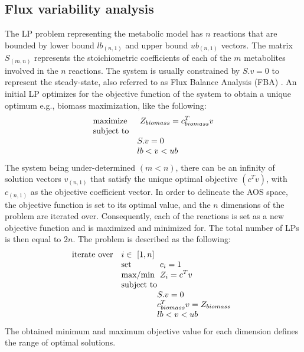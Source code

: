 \subsection*{Flux variability analysis}
The LP problem representing the metabolic model has $n$ reactions that are bounded by lower bound $lb_{(n,1)}$ and upper bound $ub_{(n,1)}$ vectors.  The matrix $S_{(m,n)}$ represents the stoichiometric coefficients of each of the $m$ metabolites involved in the $n$ reactions. The system is usually constrained by $S.v=0$ to represent the steady-state, also referred to as Flux Balance Analysis (FBA) \cite{orth2010flux}. An initial LP optimizes for the objective function of the system to obtain a unique optimum e.g., biomass maximization, like the following:
\begin{equation} \label{eq:one}
\begin{array}{ll@{}ll}
\text{maximize}  & \displaystyle\ Z_{biomass}=c^{T}_{biomass}v &\\
\text{subject to}\\
& S.v=0 \\
& lb<v<ub
\end{array}
\end{equation}
The system being under-determined $(m<n)$, there can be an infinity of solution vectors $v_{(n,1)}$ that satisfy the unique optimal objective $(c^{T}v)$, with $c_{(n,1)}$ as the objective coefficient vector. In order to delineate the AOS space, the objective function is set to its optimal value, and the $n$ dimensions of the problem are iterated over. Consequently, each of the reactions is set as a new objective function and is maximized and minimized for. The total number of LPs is then equal to $2n$. The problem is described as the following:
\begin{equation} \label{eq:two}
\begin{array}{ll@{}ll@{}ll}
\text{iterate over} & i \in \displaystyle\ [1,n] &\\
& \text{set} & \displaystyle\ c_{i}=1 &\\
& \text{max/min}  & \displaystyle\ Z_{i}=c^{T}v &\\
& \text{subject to}\\
& & S.v=0 \\
& & c^{T}_{biomass}v=Z_{biomass} \\
& & lb<v<ub
\end{array}
\end{equation}
The obtained minimum and maximum objective value for each dimension defines the range of optimal solutions.
